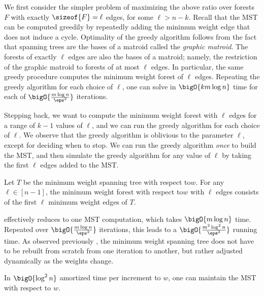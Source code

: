 \documentclass{toc}
\newcommand{\weightv}{w}%
\newcommand{\wrt}{with respect to\xspace} %
\begin{document}
We first consider the simpler problem of maximizing the above ratio
over forests $F$ with exactly $\sizeof{F} = \ell$ edges, for some
$\ell > n - k$. Recall that the MST can be computed greedily by
repeatedly adding the minimum weight edge that does not induce a
cycle. Optimality of the greedy algorithm follows from the fact that
spanning trees are the bases of a matroid called the \emph{graphic
  matroid}. The forests of exactly $\ell$ edges are also the bases of
a matroid; namely, the restriction of the graphic matroid to forests
of at most $\ell$ edges. In particular, the same greedy procedure
computes the minimum weight forest of $\ell$ edges. Repeating the
greedy algorithm for each choice of $\ell$, one can solve
 in $\bigO{k m \log n}$ time for each of
\begin{math}
  \bigO{\frac{m \log n}{\eps^2}}
\end{math}
iterations.

Stepping back, we want to compute the minimum weight forest with
$\ell$ edges for a range of $k - 1$ values of $\ell$, and we can run
the greedy algorithm for each choice of $\ell$. We observe that the
greedy algorithm is oblivious to the parameter $\ell$, except for
deciding when to stop. We can run the greedy algorithm \emph{once} to
build the MST, and then simulate the greedy algorithm for any value of
$\ell$ by taking the first $\ell$ edges added to the MST.

\begin{lemma}
   Let $T$ be the minimum weight
  spanning tree \wrt $\weightv$. For any $\ell \in [n-1]$, the minimum
  weight forest \wrt $\weightv$ with $\ell$ edges consists of the
  first $\ell$ minimum weight edges of $T$.
\end{lemma}

 effectively reduces
 to one MST computation, which takes
$\bigO{m\log n}$ time. Repeated over $\bigO{\frac{m \log n}{\eps^2}}$
iterations, this leads to a $\bigO{\frac{m^2 \log^2 n}{\eps^2}}$
running time.  As observed previously \cite{thorup-08,cq-17-soda},
the minimum weight spanning tree does not have to be rebuilt from
scratch from one iteration to another, but rather adjusted dynamically
as the weights change.

\begin{lemma}
   In $\bigO{\log^2 n}$ amortized time per
  increment to $\weightv$, one can maintain the MST \wrt
  $\weightv$.
\end{lemma}
\end{document}
